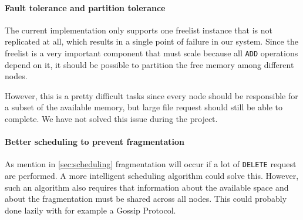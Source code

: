 \documentclass[12pt,a4paper]{scrartcl}
\begin{document}
\paragraph{Fault tolerance and partition tolerance}
The current implementation only supports one freelist instance that is not replicated at all, which results in a single point of failure in our system. Since the freelist is a very important component that must scale because all \verb|ADD| operations depend on it, it should be possible to partition the free memory among different nodes.

However, this is a pretty difficult tasks since every node should be responsible for a subset of the available memory, but large file request should still be able to complete. We have not solved this issue during the project.

\paragraph{Better scheduling to prevent fragmentation}
As mention in \autoref{sec:scheduling} fragmentation will occur if a lot of \verb|DELETE| request are performed. A more intelligent scheduling algorithm could solve this. However, such an algorithm also requires that information about the available space and about the fragmentation must be shared across all nodes. This could probably done lazily with for example a Gossip Protocol.



\nocite{*}
\end{document}
